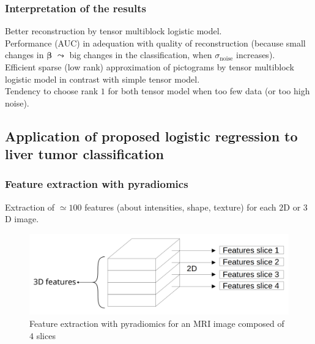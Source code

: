 \documentclass{beamer}
\begin{document}
\begin{frame}
    \frametitle{Interpretation of the results}
    Better reconstruction by tensor multiblock logistic model.\\[10 pt]
    Performance (AUC) in adequation with quality of reconstruction (because small changes in $\bm{\beta}$ $\leadsto$ big changes in the classification, when $\sigma_{\text{noise}}$ increases).\\[10 pt]
    Efficient sparse (low rank) approximation of pictograms by tensor multiblock logistic model in contrast with simple tensor model.\\[10 pt]
    Tendency to choose rank $1$ for both tensor model when too few data (or too high noise).

\end{frame}

\begin{frame}
    \section{Application of proposed logistic regression to liver tumor classification}
\end{frame}

\begin{frame}
    \frametitle{Feature extraction with pyradiomics \cite{pyradio}}
    Extraction of $\simeq  100$ features (about intensities, shape, texture) for each $2$D or $3$D image.\\[10 pt]
    \begin{figure}
        \centering
        \includegraphics[scale = 0.15]{images/features.png}
        \caption{Feature extraction with pyradiomics for an MRI image composed of $4$ slices}
    \end{figure}
\end{frame}

\end{document}
